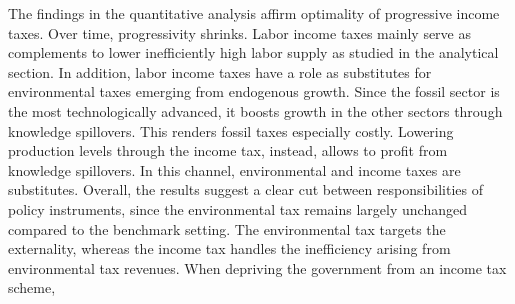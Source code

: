   



The findings in the quantitative analysis affirm optimality of progressive income taxes. Over time, progressivity shrinks.
Labor income taxes mainly serve as complements to lower inefficiently high labor supply as studied in the analytical section. 
In addition, labor income taxes have a role as substitutes for environmental taxes emerging from endogenous growth.
Since the fossil sector is the most technologically advanced, it boosts growth in the other sectors through knowledge spillovers. This renders fossil taxes especially costly. Lowering production levels through the income tax, instead, allows to profit from knowledge spillovers. In this channel, environmental and income taxes are substitutes. 
Overall, the results suggest a clear cut between responsibilities of policy instruments, since the environmental tax remains largely unchanged compared to the benchmark setting.  The environmental tax targets the externality, whereas the income tax handles the inefficiency arising from environmental tax revenues. When depriving the government from an income tax scheme, 

 

